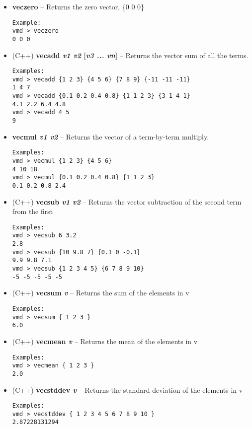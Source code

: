 \begin{itemize}
\item {\bf veczero} --
Returns the zero vector, \{0 0 0\}
\begin{verbatim}
Example:
vmd > veczero
0 0 0
\end{verbatim}

\item (C++) {\bf vecadd {\it v1 v2} [{\it v3 ... vn}]} --
Returns the vector sum of all the terms.
\begin{verbatim}
Examples:
vmd > vecadd {1 2 3} {4 5 6} {7 8 9} {-11 -11 -11}
1 4 7
vmd > vecadd {0.1 0.2 0.4 0.8} {1 1 2 3} {3 1 4 1}
4.1 2.2 6.4 4.8
vmd > vecadd 4 5
9
\end{verbatim}

\item {\bf vecmul {\it v1 v2}} --
Returns the vector of a term-by-term multiply.
\begin{verbatim}
Examples:
vmd > vecmul {1 2 3} {4 5 6} 
4 10 18
vmd > vecmul {0.1 0.2 0.4 0.8} {1 1 2 3}
0.1 0.2 0.8 2.4
\end{verbatim}

\item (C++) {\bf vecsub {\it v1 v2}} --
Returns the vector subtraction of the second term from the first
\begin{verbatim}
Examples:
vmd > vecsub 6 3.2
2.8
vmd > vecsub {10 9.8 7} {0.1 0 -0.1}
9.9 9.8 7.1
vmd > vecsub {1 2 3 4 5} {6 7 8 9 10}
-5 -5 -5 -5 -5
\end{verbatim}

\item (C++) {\bf vecsum {\it v}} --
Returns the sum of the elements in v
\begin{verbatim}
Examples:
vmd > vecsum { 1 2 3 }
6.0
\end{verbatim}

\item (C++) {\bf vecmean {\it v}} --
Returns the mean of the elements in v
\begin{verbatim}
Examples:
vmd > vecmean { 1 2 3 }
2.0
\end{verbatim}

\item (C++) {\bf vecstddev {\it v}} --
Returns the standard deviation of the elements in v
\begin{verbatim}
Examples:
vmd > vecstddev { 1 2 3 4 5 6 7 8 9 10 }
2.87228131294
\end{verbatim}


\end{itemize}
